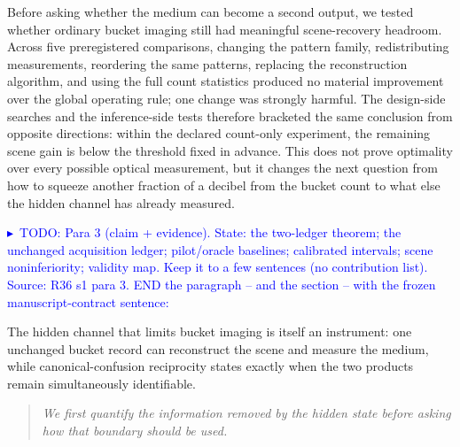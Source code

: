\documentclass[10pt,twocolumn]{article}
\newcommand{\TODOc}[1]{\par\smallskip\noindent\textcolor{blue}{\footnotesize$\blacktriangleright$~TODO: #1}\par\smallskip}
\begin{document}
Before asking whether the medium can become a second output, we tested whether
ordinary bucket imaging still had meaningful scene-recovery headroom. Across five
preregistered comparisons, changing the pattern family, redistributing
measurements, reordering the same patterns, replacing the reconstruction
algorithm, and using the full count statistics produced no material improvement
over the global operating rule; one change was strongly harmful. The design-side
searches and the inference-side tests therefore bracketed the same conclusion from
opposite directions: within the declared count-only experiment, the remaining
scene gain is below the threshold fixed in advance. This does not prove optimality
over every possible optical measurement, but it changes the next question from how
to squeeze another fraction of a decibel from the bucket count to what else the
hidden channel has already measured.

\TODOc{Para 3 (claim + evidence). State: the two-ledger theorem; the unchanged
acquisition ledger; pilot/oracle baselines; calibrated intervals; scene
noninferiority; validity map. Keep it to a few sentences (no contribution list).
Source: R36 s1 para 3. END the paragraph -- and the section -- with the frozen
manuscript-contract sentence:}
The hidden channel that limits bucket imaging is itself an instrument: one
unchanged bucket record can reconstruct the scene and measure the medium, while
canonical-confusion reciprocity states exactly when the two products remain
simultaneously identifiable.

\begin{quote}\itshape\small
We first quantify the information removed by the hidden state before asking how
that boundary should be used.
\end{quote}
\end{document}
